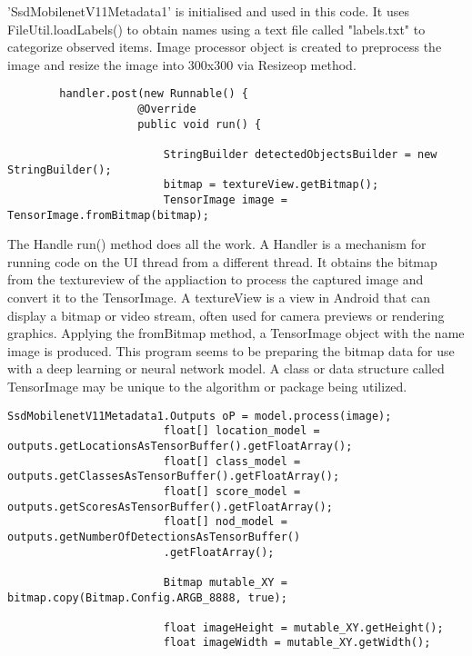 \documentclass[MScCS]{uccthesis}
\begin{document}
'SsdMobilenetV11Metadata1' is initialised and used in this code. It uses FileUtil.loadLabels() to obtain names using a text file called "labels.txt" to categorize observed items. Image processor object is created to preprocess the image and resize the image into 300x300 via Resizeop method.

\begin{scriptsize}
    \begin{verbatim}
        handler.post(new Runnable() {
                    @Override
                    public void run() {

                        StringBuilder detectedObjectsBuilder = new StringBuilder();
                        bitmap = textureView.getBitmap();
                        TensorImage image = TensorImage.fromBitmap(bitmap);

\end{verbatim}
\end{scriptsize}

The Handle run() method does all the work. A Handler is a mechanism for running code on the UI thread from a different thread.  It obtains the bitmap from the textureview of the appliaction to process the captured image and convert it to the TensorImage. A textureView is a view in Android that can display a bitmap or video stream, often used for camera previews or rendering graphics. Applying the fromBitmap method, a TensorImage object with the name image is produced. This program seems to be preparing the bitmap data for use with a deep learning or neural network model. A class or data structure called TensorImage may be unique to the algorithm or package being utilized.

\begin{scriptsize}
    \begin{verbatim}
SsdMobilenetV11Metadata1.Outputs oP = model.process(image);
                        float[] location_model = outputs.getLocationsAsTensorBuffer().getFloatArray();
                        float[] class_model = outputs.getClassesAsTensorBuffer().getFloatArray();
                        float[] score_model = outputs.getScoresAsTensorBuffer().getFloatArray();
                        float[] nod_model = outputs.getNumberOfDetectionsAsTensorBuffer()
                        .getFloatArray();

                        Bitmap mutable_XY = bitmap.copy(Bitmap.Config.ARGB_8888, true);

                        float imageHeight = mutable_XY.getHeight();
                        float imageWidth = mutable_XY.getWidth();        
    \end{verbatim}
\end{scriptsize}
                        
\end{document}
